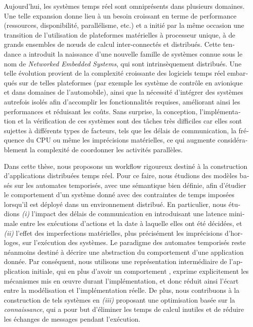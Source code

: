 \begin{abstractfr}
\begin{otherlanguage}{french}
Aujourd'hui, les systèmes temps réel sont omniprésents dans plusieurs domaines.
Une telle expansion donne lieu à un besoin croissant en terme de performance (ressources,
disponibilité, parallélisme, etc.) et a initié par la même occasion une transition de
l'utilisation de plateformes matérielles à processeur unique, à de grands ensembles
de nœuds de calcul inter-connectés et distribués. Cette tendance a introduit la naissance
d'une nouvelle famille de systèmes connue sous le nom de \emph{Networked Embedded Systems},
qui sont intrinsèquement distribués.
Une telle évolution provient de la complexité croissante des logiciels temps réel
embarqués sur de telles plateformes (par exemple les système de contrôle en avionique
et dans domaines de l'automobile), ainsi que la nécessité d'intégrer des systèmes autrefois 
isolés afin d'accomplir les fonctionnalités requises, améliorant ainsi les performances 
et réduisant les coûts.
Sans surprise, la conception, l'implémentation et la vérification de ces systèmes sont
des tâches très difficiles car elles sont sujettes à différents types de facteurs, tels que les 
délais de communication, la fréquence du CPU ou même les imprécisions matérielles, 
ce qui augmente considérablement la complexité de coordonner les activités parallèles.

Dans cette thèse, nous proposons un workflow rigoureux destiné à la construction d'applications 
distribuées temps réel.
Pour ce faire, nous étudions des modèles basés sur les automates temporisés, avec une sémantique
bien définie, afin d'étudier le comportement d'un système donné avec des contraintes de temps 
imposées lorsqu'il est déployé dans un environnement distribué. En particulier, nous étudions 
\emph{(i)} l'impact des délais de communication en introduisant une latence minimale entre 
les exécutions d'actions et la date à laquelle elles ont été décidées,
et \emph{(ii)} l'effet des imperfections matérielles, plus précisément les imprécisions 
d'horloges, sur l'exécution des systèmes. 
Le paradigme des automates temporisés reste néanmoins destiné à décrire une abstraction 
du comportement d'une application donnée.
Par conséquent, nous utilisons une représentation intermédiaire de
l'application initiale, qui en plus d'avoir un comportement , exprime 
explicitement les mécanismes mis en œuvre durant l'implémentation, et donc réduit ainsi 
l'écart entre la modélisation et l'implémentation réelle.
De plus, nous contribuons à la construction de tels systèmes en \emph{(iii)}
proposant une optimisation basée sur la \emph{connaissance}, qui a pour but d'éliminer les 
temps de calcul inutiles et de réduire les échanges de messages pendant l'exécution.
  


\end{otherlanguage}
\end{abstractfr}

